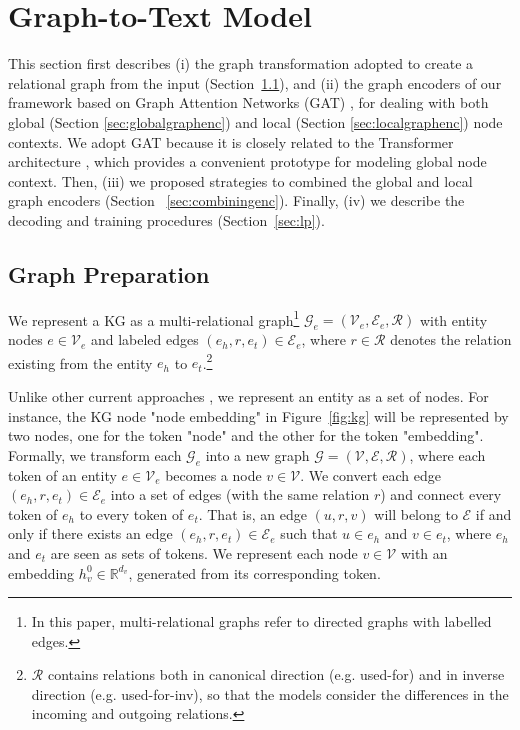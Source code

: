 \documentclass[11pt,a4paper]{article}
\begin{document}
%
 \section{Graph-to-Text Model}
\label{sec:background}



This section first describes (i) the graph transformation adopted to create a relational graph from the input (Section~\ref{sec:graph_preparation}), and (ii) the graph encoders of our framework based on Graph Attention Networks (GAT) \cite{velickovic2018graph}, for dealing with both global (Section \ref{sec:globalgraphenc}) and local (Section \ref{sec:localgraphenc}) node contexts. We adopt GAT because it is closely related to the Transformer architecture \cite{NIPS2017_7181}, which provides a convenient prototype for modeling global node context. Then, (iii) we proposed strategies to combined the global and local graph encoders (Section
~\ref{sec:combiningenc}). Finally, (iv) we describe the decoding and training procedures (Section~\ref{sec:lp}).













\subsection{Graph Preparation}
\label{sec:graph_preparation}
We represent a KG as a multi-relational graph\footnote{In this paper, multi-relational graphs refer to directed graphs with labelled edges.} $\mathcal{G}_e = (\mathcal{V}_e, \mathcal{E}_e, \mathcal{R})$ with entity nodes $e \in \mathcal{V}_e$ and labeled edges $ (e_h, r, e_t) \in \mathcal{E}_e$, where $r \in \mathcal{R}$ denotes the relation existing from the entity $e_h$ to $e_t$.\footnote{$\mathcal{R}$ contains relations both in canonical direction (e.g. used-for) and in inverse direction (e.g. used-for-inv), so that the models consider the differences in the incoming and outgoing relations.}


Unlike other current approaches \cite{koncel-kedziorski-etal-2019-text, moryossef-etal-2019-step}, we represent an entity as a set of nodes. For instance, the KG node "node embedding" in Figure~\ref{fig:kg} will be represented by two nodes, one for the token "node" and the other for the token "embedding". Formally, we transform each $\mathcal{G}_e$ into a new graph $\mathcal{G} = (\mathcal{V}, \mathcal{E}, \mathcal{R})$, where each token of an entity $e \in \mathcal{V}_e$ becomes a node $v \in \mathcal{V}$. We convert each edge $ (e_h, r, e_t) \in \mathcal{E}_e$ into a set of edges (with the same relation $r$) and connect every token of $e_h$ to every token of $e_t$. That is, an edge $(u, r, v)$ will belong to $\mathcal{E}$ if and only if there exists an edge $ (e_h, r, e_t) \in \mathcal{E}_e$ such that $u \in e_h$ and $v \in e_t$, where $e_h$ and $e_t$ are seen as sets of tokens. We represent each node $v \in \mathcal{V}$ with an embedding $h^{0}_v \in  \mathbb{R}^{d_v}$, generated from its corresponding token.
\end{document}
